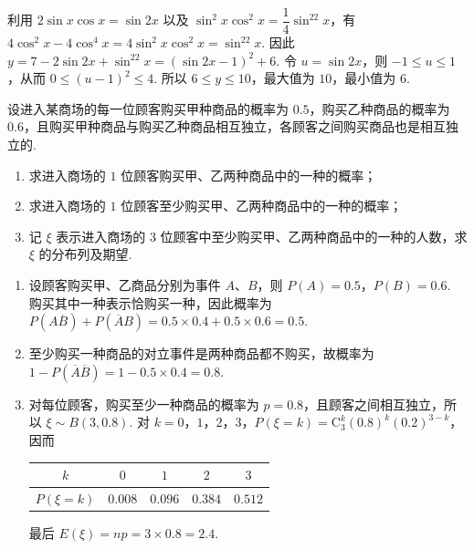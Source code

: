 \begin{solution}
利用 \(2\sin x\cos x=\sin2x\) 以及 \(\sin^2x\cos^2x=\dfrac14\sin^22x\)，有 \(4\cos^2x-4\cos^4x=4\sin^2x\cos^2x=\sin^22x\). 因此
\(y=7-2\sin2x+\sin^22x=(\sin2x-1)^2+6\). 令 \(u=\sin2x\)，则 \(-1\leqslant u\leqslant1\)，从而 \(0\leqslant(u-1)^2\leqslant4\). 所以 \(6\leqslant y\leqslant10\)，最大值为 \(10\)，最小值为 \(6\).
\end{solution}

\begin{problem}
设进入某商场的每一位顾客购买甲种商品的概率为 \(0.5\)，购买乙种商品的概率为 \(0.6\)，且购买甲种商品与购买乙种商品相互独立，各顾客之间购买商品也是相互独立的.

\begin{enumerate}
\item 求进入商场的 \(1\) 位顾客购买甲、乙两种商品中的一种的概率；
\item 求进入商场的 \(1\) 位顾客至少购买甲、乙两种商品中的一种的概率；
\item 记 \(\xi\) 表示进入商场的 \(3\) 位顾客中至少购买甲、乙两种商品中的一种的人数，求 \(\xi\) 的分布列及期望.
\end{enumerate}
\end{problem}

\begin{solution}
\begin{enumerate}
\item 设顾客购买甲、乙商品分别为事件 \(A\)、\(B\)，则 \(P(A)=0.5\)，\(P(B)=0.6\). 购买其中一种表示恰购买一种，因此概率为 \(P(A\overline B)+P(\overline A B)=0.5\times0.4+0.5\times0.6=0.5\).
\item 至少购买一种商品的对立事件是两种商品都不购买，故概率为 \(1-P(\overline A\overline B)=1-0.5\times0.4=0.8\).
\item 对每位顾客，购买至少一种商品的概率为 \(p=0.8\)，且顾客之间相互独立，所以 \(\xi\sim B(3,0.8)\). 对 \(k=0\)，\(1\)，\(2\)，\(3\)，\(P(\xi=k)=\mathrm C_3^k(0.8)^k(0.2)^{3-k}\)，因而
\begin{center}
\begin{tabular}{c|cccc}
\(k\) & \(0\) & \(1\) & \(2\) & \(3\) \\
\hline
\(P(\xi=k)\) & \(0.008\) & \(0.096\) & \(0.384\) & \(0.512\)
\end{tabular}
\end{center}
最后 \(E(\xi)=np=3\times0.8=2.4\).
\end{enumerate}
\end{solution}

